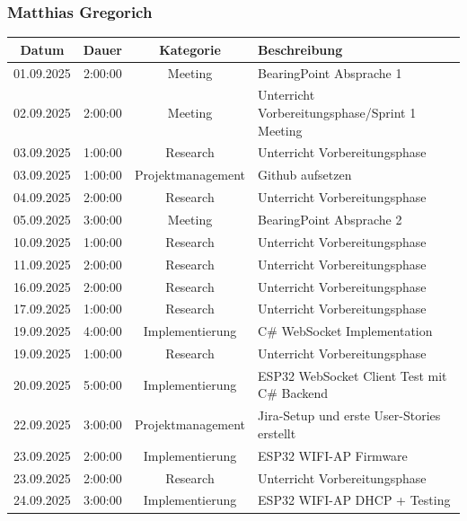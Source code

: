 \documentclass{article}
\begin{document}
\subsubsection*{Matthias Gregorich}
\begin{table}[H]
  \centering
  \begin{tabularx}{\textwidth}{|c|c|c|X|}
    \hline
    \rowcolor{black!10}\textbf{Datum} & \textbf{Dauer} & \textbf{Kategorie} & \textbf{Beschreibung} \\
    \hline
    01.09.2025 & 2:00:00 & Meeting           & BearingPoint Absprache 1 \\ \hline
    02.09.2025 & 2:00:00 & Meeting           & Unterricht Vorbereitungsphase/Sprint 1 Meeting \\ \hline
    03.09.2025 & 1:00:00 & Research          & Unterricht Vorbereitungsphase \\ \hline
    03.09.2025 & 1:00:00 & Projektmanagement & Github aufsetzen \\ \hline
    04.09.2025 & 2:00:00 & Research          & Unterricht Vorbereitungsphase \\ \hline
    05.09.2025 & 3:00:00 & Meeting           & BearingPoint Absprache 2 \\ \hline
    10.09.2025 & 1:00:00 & Research          & Unterricht Vorbereitungsphase \\ \hline
    11.09.2025 & 2:00:00 & Research          & Unterricht Vorbereitungsphase \\ \hline
    16.09.2025 & 2:00:00 & Research          & Unterricht Vorbereitungsphase \\ \hline
    17.09.2025 & 1:00:00 & Research          & Unterricht Vorbereitungsphase \\ \hline
    19.09.2025 & 4:00:00 & Implementierung   & C\# WebSocket Implementation \\ \hline
    19.09.2025 & 1:00:00 & Research          & Unterricht Vorbereitungsphase \\ \hline
    20.09.2025 & 5:00:00 & Implementierung   & ESP32 WebSocket Client Test mit C\# Backend \\ \hline
    22.09.2025 & 3:00:00 & Projektmanagement & Jira-Setup und erste User-Stories erstellt \\ \hline
    23.09.2025 & 2:00:00 & Implementierung   & ESP32 WIFI-AP Firmware \\ \hline
    23.09.2025 & 2:00:00 & Research          & Unterricht Vorbereitungsphase \\ \hline
    24.09.2025 & 3:00:00 & Implementierung   & ESP32 WIFI-AP DHCP + Testing \\ \hline

\end{tabularx}
\end{table}
\end{document}
